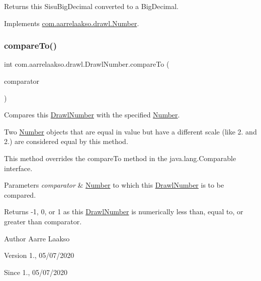 \begin{DoxyReturn}{Returns}
this Sisu\+Big\+Decimal converted to a Big\+Decimal. 
\end{DoxyReturn}


Implements \hyperlink{interfacecom_1_1aarrelaakso_1_1drawl_1_1_number_a88d32e8ed7137662dc845ac6937107e6}{com.\+aarrelaakso.\+drawl.\+Number}.

\mbox{\label{classcom_1_1aarrelaakso_1_1drawl_1_1_drawl_number_a40d2c6535f85306aaf5b6e5886c51266}} 
\subsubsection{\texorpdfstring{compare\+To()}{compareTo()}}
{\footnotesize\ttfamily int com.\+aarrelaakso.\+drawl.\+Drawl\+Number.\+compare\+To (\begin{DoxyParamCaption}\item[{@Not\+Null final \hyperlink{interfacecom_1_1aarrelaakso_1_1drawl_1_1_number}{Number}}]{comparator }\end{DoxyParamCaption})}



Compares this \hyperlink{classcom_1_1aarrelaakso_1_1drawl_1_1_drawl_number}{Drawl\+Number} with the specified \hyperlink{interfacecom_1_1aarrelaakso_1_1drawl_1_1_number}{Number}. 

Two \hyperlink{interfacecom_1_1aarrelaakso_1_1drawl_1_1_number}{Number} objects that are equal in value but have a different scale (like 2. and 2.) are considered equal by this method. 

This method overrides the compare\+To method in the java.\+lang.\+Comparable interface.


\begin{DoxyParams}{Parameters}
{\em comparator} & \hyperlink{interfacecom_1_1aarrelaakso_1_1drawl_1_1_number}{Number} to which this \hyperlink{classcom_1_1aarrelaakso_1_1drawl_1_1_drawl_number}{Drawl\+Number} is to be compared. \\
\hline
\end{DoxyParams}
\begin{DoxyReturn}{Returns}
-\/1, 0, or 1 as this \hyperlink{classcom_1_1aarrelaakso_1_1drawl_1_1_drawl_number}{Drawl\+Number} is numerically less than, equal to, or greater than comparator. 
\end{DoxyReturn}
\begin{DoxyAuthor}{Author}
Aarre Laakso 
\end{DoxyAuthor}
\begin{DoxyVersion}{Version}
1., 05/07/2020 
\end{DoxyVersion}
\begin{DoxySince}{Since}
1., 05/07/2020 
\end{DoxySince}



